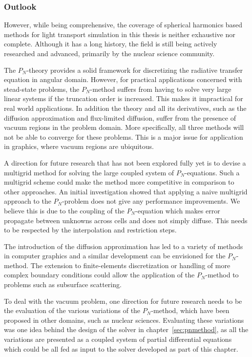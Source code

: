 \subsubsection*{Outlook}

However, while being comprehensive, the coverage of spherical harmonics based methods for light transport simulation in this thesis is neither exhaustive nor complete. Although it has a long history, the field is still being actively researched and advanced, primarily by the nuclear science community.

The $P_N$-theory provides a solid framework for discretizing the radiative transfer equation in angular domain. However, for practical applications concerned with stead-state problems, the $P_N$-method suffers from having to solve very large linear systems if the truncation order is increased. This makes it impractical for real world applications. In addition the theory and all its derivatives, such as the diffusion approximation and flux-limited diffusion, suffer from the presence of vacuum regions in the problem domain. More specifically, all three methods will not be able to converge for these problems. This is a major issue for application in graphics, where vacuum regions are ubiquitous.

A direction for future research that has not been explored fully yet is to devise a multigrid method for solving the large coupled system of $P_N$-equations. Such a multigrid scheme could make the method more competitive in comparison to other approaches. An initial investigation showed that applying a naive multigrid approach to the $P_N$-problem does not give any performance improvements. We believe this is due to the coupling of the $P_N$-equation which makes error propagate between unknowns across cells and does not simply diffuse. This needs to be respected by the interpolation and restriction steps.

The introduction of the diffusion approximation has led to a variety of methods in computer graphics and a similar development can be envisioned for the $P_N$-method. The extension to finite-elements discretization or handling of more complex boundary conditions could allow the application of the $P_N$-method to problems such as subsurface scattering.

To deal with the vacuum problem, one direction for future research needs to be the evaluation of the various variations of the $P_N$-method, which have been proposed in other domains, such as nuclear sciences. Evaluating these variations was one idea behind the design of the solver in chapter~\ref{sec:pnmethod}, as all the variations are presented as a coupled system of partial differential equations which could be all fed as input to the solver developed as part of this chapter.


